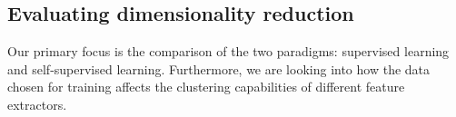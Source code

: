\subsection{Evaluating dimensionality reduction}
\label{ssub:eval_dim_reduc}

Our primary focus is the comparison of the two paradigms: supervised learning and self-supervised learning.
Furthermore, we are looking into how the data chosen for training affects the clustering capabilities of different feature extractors.





